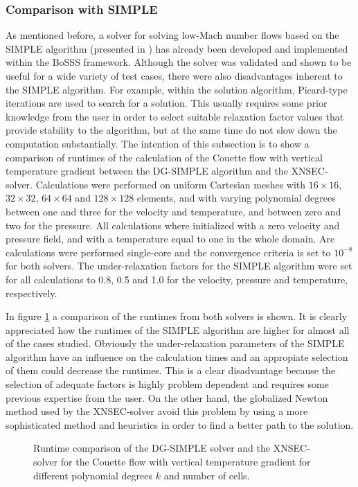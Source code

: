 \subsubsection{Comparison with SIMPLE}
As mentioned before, a solver for solving low-Mach number flows based on the SIMPLE algorithm (presented in \textcite{kleinHighorderDiscontinuousGalerkin2016}) has already been developed and implemented within the BoSSS framework.
Although the solver was validated and shown to be useful for a wide variety of test cases, there were also disadvantages inherent to the SIMPLE algorithm. For example,
within the solution algorithm, Picard-type iterations are used to search for a solution. This usually requires some prior knowledge from the user in order to select suitable relaxation factor values that provide stability to the algorithm, but at the same time do not slow down the computation substantially. 
The intention of this subsection is to show a comparison of runtimes of the calculation of the Couette flow with vertical temperature gradient between the DG-SIMPLE algorithm \parencite{kleinHighorderDiscontinuousGalerkin2016} and the XNSEC-solver. Calculations were performed on uniform Cartesian meshes with $16\times16$, $32\times32$, $64\times64$ and $128\times128$ elements, and with varying polynomial degrees between one and three for the velocity and temperature, and between zero and two for the pressure. All calculations where initialized with a zero velocity and pressure field, and with a temperature equal to one in the whole domain. Are calculations were performed single-core and the convergence criteria is set to $10^{-8}$ for both solvers. The under-relaxation factors for the SIMPLE algorithm were set for all calculations to 0.8, 0.5 and 1.0 for the velocity, pressure and temperature, respectively.

In figure \cref{fig:RuntimeComparison} a comparison of the runtimes from both solvers is shown. It is clearly  appreciated how the runtimes of the SIMPLE algorithm are higher for almost all of the cases studied. Obviously the under-relaxation parameters of the SIMPLE algorithm have an influence on the calculation times and an appropiate selection of them could decrease the runtimes. This is a clear disadvantage because the selection of adequate factors is highly problem dependent and requires some previous expertise from the user. On the other hand, the globalized Newton method used by the XNSEC-solver avoid this problem by using a more sophisticated method and heuristics in order to find a better path to the solution.




\begin{figure}	
\centering
	\caption{Runtime comparison of the DG-SIMPLE solver and the XNSEC-solver for the Couette flow with vertical temperature gradient for different polynomial degrees $k$ and number of cells.}
	\label{fig:RuntimeComparison}
\end{figure}


